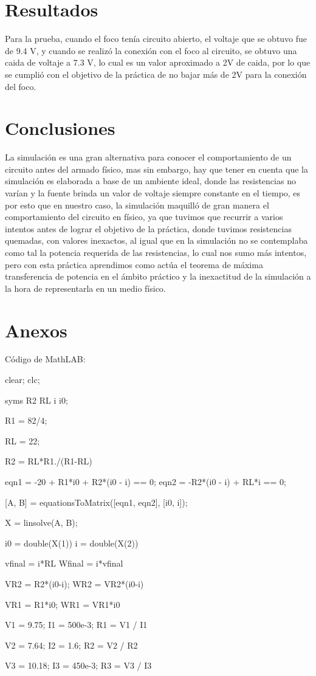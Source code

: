 \documentclass[]{article}
\begin{document}
\section{Resultados}

Para la prueba, cuando el foco tenía circuito abierto, el voltaje que se obtuvo fue de 9.4 V, y cuando se realizó la conexión con el foco al circuito, se obtuvo una caida de voltaje
a 7.3 V, lo cual es un valor aproximado a 2V de caida, por lo que se cumplió con el objetivo de la práctica de no bajar más de 2V para la conexión del foco.

\section{Conclusiones}

La simulación es una gran alternativa para conocer el comportamiento de un circuito antes del armado físico, mas sin embargo, hay que tener en cuenta que la simulación es 
elaborada a base de un ambiente ideal, donde las resistencias no varían y la fuente brinda un valor de voltaje siempre constante en el tiempo, es por esto que en nuestro caso, 
la simulación maquilló de gran manera el comportamiento del circuito en físico, ya que tuvimos que recurrir a varios intentos antes de lograr el objetivo de la práctica, donde
tuvimos resistencias quemadas, con valores inexactos, al igual que en la simulación no se contemplaba como tal la potencia requerida de las resistencias, lo cual nos sumo más 
intentos, pero con esta práctica aprendimos como actúa el teorema de máxima transferencia de potencia en el ámbito práctico y la inexactitud de la simulación a la hora de representarla
en un medio físico.

\section{Anexos}
Código de MathLAB:

clear; clc;

syms R2 RL i i0;

R1 = 82/4;

RL = 22;

R2 = RL*R1./(R1-RL)

eqn1 = -20 + R1*i0 + R2*(i0 - i) == 0;
eqn2 = -R2*(i0 - i) + RL*i == 0;

[A, B] = equationsToMatrix([eqn1, eqn2], [i0, i]);

X = linsolve(A, B);

i0 = double(X(1))
i = double(X(2))

vfinal = i*RL
Wfinal = i*vfinal

VR2 = R2*(i0-i);
WR2 = VR2*(i0-i)

VR1 = R1*i0;
WR1 = VR1*i0

V1 = 9.75;
I1 = 500e-3;
R1 = V1 / I1

V2 = 7.64;
I2 = 1.6;
R2 = V2 / R2

V3 = 10.18;
I3 = 450e-3;
R3 = V3 / I3


\end{document}
